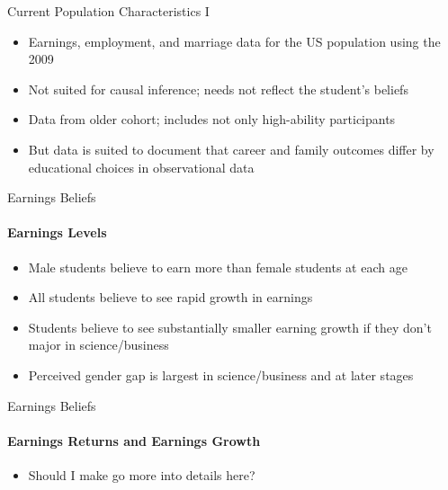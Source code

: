 \documentclass[12pt]{beamer}
\begin{document}
\begin{frame}{Current Population Characteristics I}
    \begin{itemize}
        \item Earnings, employment, and marriage data for the US population using the 2009
        \item Not suited for causal inference; needs not reflect the student's beliefs
        \item Data from older cohort; includes not only high-ability participants
        \item But data is suited to document that career and family outcomes differ by educational choices in observational data
    \end{itemize}
\end{frame}

\begin{frame}{Earnings Beliefs}
    \framesubtitle{Earnings Levels} 
    \begin{itemize}
        \item Male students believe to earn more than female students at each age
        \item All students believe to see rapid growth in earnings
        \item Students believe to see substantially smaller earning growth if they don't major in science/business
        \item Perceived gender gap is largest in science/business and at later stages
    \end{itemize}
\end{frame}

\begin{frame}{Earnings Beliefs}
    \framesubtitle{Earnings Returns and Earnings Growth} 
    \begin{itemize}
        \item Should I make go more into details here?
    \end{itemize}
\end{frame}
\end{document}
